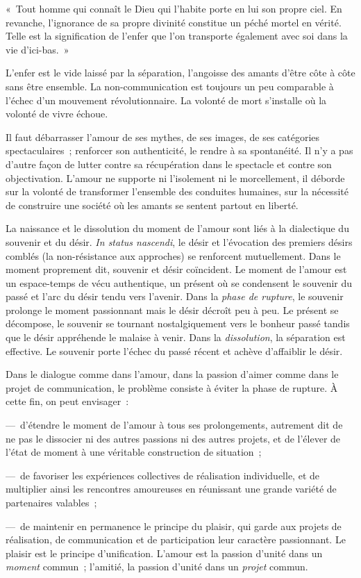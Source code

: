 \documentclass[french,twoside]{book} %
\newcommand{\astermono}{\medskip\centerline{\color{rubric}\large\selectfont{\syms ✻}}\medskip\par}%
\newenvironment{quoteblock}%
  {\begin{quoting}}
  {\end{quoting}}
\newenvironment{quotebar}{%
    \def\FrameCommand{{\color{rubric!10!}\vrule width 0.5em} \hspace{0.9em}}%
    \def\OuterFrameSep{\itemsep} %
    \MakeFramed {\advance\hsize-\width \FrameRestore}
  }%
  {%
    \endMakeFramed
  }
\renewenvironment{quoteblock}%
  {%
    \savenotes
    \setstretch{0.9}
    \normalfont
    \begin{quotebar}
  }
  {%
    \end{quotebar}
    \spewnotes
  }
\begin{document}
\begin{quoteblock}
\noindent « Tout homme qui connaît le Dieu qui l’habite porte en lui son propre ciel. En revanche, l’ignorance de sa propre divinité constitue un péché mortel en vérité. Telle est la signification de l’enfer que l’on transporte également avec soi dans la vie d’ici-bas. »\end{quoteblock}

\noindent L’enfer est le vide laissé par la séparation, l’angoisse des amants d’être côte à côte sans être ensemble. La non-communication est toujours un peu comparable à l’échec d’un mouvement révolutionnaire. La volonté de mort s’installe où la volonté de vivre échoue.\par

\astermono

\noindent Il faut débarrasser l’amour de ses mythes, de ses images, de ses catégories spectaculaires ; renforcer son authenticité, le rendre à sa spontanéité. Il n’y a pas d’autre façon de lutter contre sa récupération dans le spectacle et contre son objectivation. L’amour ne supporte ni l’isolement ni le morcellement, il déborde sur la volonté de transformer l’ensemble des conduites humaines, sur la nécessité de construire une société où les amants se sentent partout en liberté.\par
La naissance et le dissolution du moment de l’amour sont liés à la dialectique du souvenir et du désir. \emph{In status nascendi}, le désir et l’évocation des premiers désirs comblés (la non-résistance aux approches) se renforcent mutuellement. Dans le moment proprement dit, souvenir et désir coïncident. Le moment de l’amour est un espace-temps de vécu authentique, un présent où se condensent le souvenir du passé et l’arc du désir tendu vers l’avenir. Dans la \emph{phase de rupture}, le souvenir prolonge le moment passionnant mais le désir décroît peu à peu. Le présent se décompose, le souvenir se tournant nostalgiquement vers le bonheur passé tandis que le désir appréhende le malaise à venir. Dans la \emph{dissolution}, la séparation est effective. Le souvenir porte l’échec du passé récent et achève d’affaiblir le désir.\par
Dans le dialogue comme dans l’amour, dans la passion d’aimer comme dans le projet de communication, le problème consiste à éviter la phase de rupture. À cette fin, on peut envisager :\par
— d’étendre le moment de l’amour à tous ses prolongements, autrement dit de ne pas le dissocier ni des autres passions ni des autres projets, et de l’élever de l’état de moment à une véritable construction de situation ;\par
— de favoriser les expériences collectives de réalisation individuelle, et de multiplier ainsi les rencontres amoureuses en réunissant une grande variété de partenaires valables ;\par
— de maintenir en permanence le principe du plaisir, qui garde aux projets de réalisation, de communication et de participation leur caractère passionnant. Le plaisir est le principe d’unification. L’amour est la passion d’unité dans un \emph{moment} commun ; l’amitié, la passion d’unité dans un \emph{projet} commun.
\end{document}
